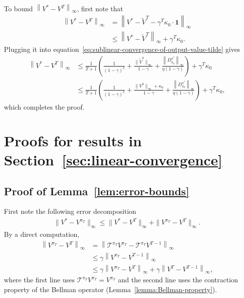 \documentclass[10pt]{article}
\newcommand{\calT}{\mathcal{T}}
\newcommand{\ls}{\left}
\newcommand{\rs}{\right}
\theoremstyle{plain}
\theoremstyle{definition}
\begin{document}
To bound $\ls\| V^* - V^T \rs\|_\infty$, first note that %
\begin{align*}
    \ls\| V^* - V^T \rs\|_\infty &= \ls\| V^* - \tilde{V}^T - \gamma^T \kappa_0 \cdot \mathbf{1} \rs\|_\infty \\
    &\leq \ls\| V^* - \tilde{V}^T \rs\|_\infty + \gamma^T \kappa_0.
\end{align*}
Plugging it into equation~\eqref{eq:sublinear-convergence-of-output-value-tilde} gives
\begin{align*}
    \ls\| V^* - V^T \rs\|_\infty &\leq \frac{1}{T+1} \ls( \frac{1}{(1-\gamma)^2} \!+\! \frac{\| \tilde{V}^0 \|_\infty}{1-\gamma} \!+\! \frac{\ls\| D^{\pi^*}_{\tilde{\pi}_0} \rs\|_\infty}{\eta(1-\gamma)} \rs) + \gamma^T \kappa_0 \\
    &\leq \frac{1}{T+1}\ls( \frac{1}{(1-\gamma)^2} \!+\! \frac{\| {V}^0 \|_\infty + \kappa_0}{1-\gamma} \!+\! \frac{\ls\| D^{\pi^*}_{{\pi}_0} \rs\|_\infty}{\eta(1-\gamma)} \rs) + \gamma^T \kappa_0,
\end{align*}
which completes the proof.

\section{Proofs for results in Section~\ref{sec:linear-convergence}}

\subsection{Proof of Lemma~\ref{lem:error-bounds}}
\label{sec:pf:lem:error-bounds}
First note the following error decomposition
\begin{align}
    \| V^* - V^{\pi_T} \|_\infty \leq \| V^* - V^T \|_\infty + \| V^{\pi_T} - V^T \|_\infty. 
    \label{eq:error-decomposition}
\end{align}
By a direct computation, 
\begin{align*}
    \ls\| V^{\pi_T} - V^T \rs\|_\infty &= \ls\| \calT^{\pi_T} V^{\pi_T} - \calT^{\pi_T} V^{T-1} \rs\|_\infty \\
    &\leq \gamma \ls\| V^{\pi_T} - V^{T-1} \rs\|_\infty \\
    &\leq \gamma \ls\| V^{\pi_T} - V^T \rs\|_\infty + \gamma \ls\| V^T - V^{T-1} \rs\|_\infty,
\end{align*}
where the first line uses $\calT^{\pi_T} V^{\pi_T} = V^{\pi_T}$ and the second line uses the contraction property of the Bellman operator (Lemma~\ref{lemma:Bellman-property}).
\end{document}
